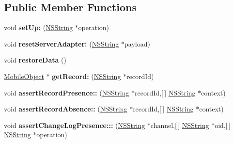 \subsection*{\-Public \-Member \-Functions}
\begin{DoxyCompactItemize}
\item 
\hypertarget{interface_abstract_integration_test_a20080f1b58ea40ef1754d2a350678159}{
void {\bfseries set\-Up\-:} (\hyperlink{class_n_s_string}{\-N\-S\-String} $\ast$operation)}
\label{interface_abstract_integration_test_a20080f1b58ea40ef1754d2a350678159}

\item 
\hypertarget{interface_abstract_integration_test_ac5932549ea8dcbee3c8508083bac3bca}{
void {\bfseries reset\-Server\-Adapter\-:} (\hyperlink{class_n_s_string}{\-N\-S\-String} $\ast$payload)}
\label{interface_abstract_integration_test_ac5932549ea8dcbee3c8508083bac3bca}

\item 
\hypertarget{interface_abstract_integration_test_ae5e42a89975dc51296b13bfd75abbba9}{
void {\bfseries restore\-Data} ()}
\label{interface_abstract_integration_test_ae5e42a89975dc51296b13bfd75abbba9}

\item 
\hypertarget{interface_abstract_integration_test_a60b4d2880b6ca512131f9c89eae5871d}{
\hyperlink{interface_mobile_object}{\-Mobile\-Object} $\ast$ {\bfseries get\-Record\-:} (\hyperlink{class_n_s_string}{\-N\-S\-String} $\ast$record\-Id)}
\label{interface_abstract_integration_test_a60b4d2880b6ca512131f9c89eae5871d}

\item 
\hypertarget{interface_abstract_integration_test_ab1e1b03aa7487775ea7a2ba371cfec99}{
void {\bfseries assert\-Record\-Presence\-::} (\hyperlink{class_n_s_string}{\-N\-S\-String} $\ast$record\-Id,\mbox{[}$\,$\mbox{]} \hyperlink{class_n_s_string}{\-N\-S\-String} $\ast$context)}
\label{interface_abstract_integration_test_ab1e1b03aa7487775ea7a2ba371cfec99}

\item 
\hypertarget{interface_abstract_integration_test_a7a3b5fe02a54bcdba619fe1ea66f07c3}{
void {\bfseries assert\-Record\-Absence\-::} (\hyperlink{class_n_s_string}{\-N\-S\-String} $\ast$record\-Id,\mbox{[}$\,$\mbox{]} \hyperlink{class_n_s_string}{\-N\-S\-String} $\ast$context)}
\label{interface_abstract_integration_test_a7a3b5fe02a54bcdba619fe1ea66f07c3}

\item 
\hypertarget{interface_abstract_integration_test_aefd339da38f098c1e4e5bc22ab9f3e36}{
void {\bfseries assert\-Change\-Log\-Presence\-:::} (\hyperlink{class_n_s_string}{\-N\-S\-String} $\ast$channel,\mbox{[}$\,$\mbox{]} \hyperlink{class_n_s_string}{\-N\-S\-String} $\ast$oid,\mbox{[}$\,$\mbox{]} \hyperlink{class_n_s_string}{\-N\-S\-String} $\ast$operation)}
\label{interface_abstract_integration_test_aefd339da38f098c1e4e5bc22ab9f3e36}

\end{DoxyCompactItemize}
